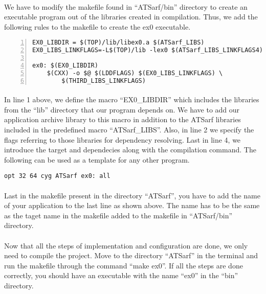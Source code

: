 \documentclass{article}
\begin{document}
\paragraph{}
We have to modify the makefile found in ``ATSarf/bin'' directory to create an executable program out of the libraries created in compilation. Thus, we add the following rules to the makefile to create the ex0 executable.

\begin{Verbatim}[numbers=left]
EX0_LIBDIR = $(TOP)/lib/libex0.a $(ATSarf_LIBS)
EX0_LIBS_LINKFLAGS=-L$(TOP)/lib -lex0 $(ATSarf_LIBS_LINKFLAGS4)

ex0: $(EX0_LIBDIR)
	$(CXX) -o $@ $(LDDFLAGS) $(EX0_LIBS_LINKFLAGS) \
		$(THIRD_LIBS_LINKFLAGS)
\end{Verbatim}

\paragraph{}
In line 1 above, we define the macro ``EX0\_LIBDIR'' which includes the libraries from the ``lib'' directory that our program depends on. We have to add our application archive library to this macro in addition to the ATSarf libraries included in the predefined macro ``ATSarf\_LIBS''. Also, in line 2 we specify the flags referring to those libraries for dependency resolving. Last in line 4, we introduce the target and dependecies along with the compilation command. The following can be used as a template for any other program.

\begin{verbatim}
opt 32 64 cyg ATSarf ex0: all
\end{verbatim}

\paragraph{}
Last in the makefile present in the directory ``ATSarf'', you have to add the name of your application to the last line as shown above. The name has to be the same as the taget name in the makefile added to the makefile in ``ATSarf/bin'' directory.

\paragraph{}
Now that all the steps of implementation and configuration are done, we only need to compile the project. Move to the directory ``ATSarf'' in the terminal and run the makefile through the command ``make ex0''. If all the steps are done correctly, you should have an executable with the name ``ex0'' in the ``bin'' directory.
\end{document}
